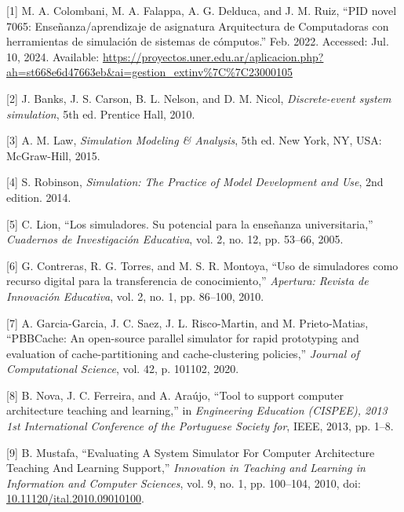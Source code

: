 \documentclass[12pt,twoside]{templates/unerthesis}
\newenvironment{cslreferences}%
  {}%
  {\par}
\begin{document}
\hypertarget{refs}{}
\begin{cslreferences}
\leavevmode\hypertarget{ref-colombani_pid_2022}{}%
{[}1{]} M. A. Colombani, M. A. Falappa, A. G. Delduca, and J. M. Ruiz, ``PID novel 7065: Enseñanza/aprendizaje de asignatura Arquitectura de Computadoras con herramientas de simulación de sistemas de cómputos.'' Feb. 2022. Accessed: Jul. 10, 2024. Available: \url{https://proyectos.uner.edu.ar/aplicacion.php?ah=st668e6d47663eb\&ai=gestion_extinv\%7C\%7C23000105}

\leavevmode\hypertarget{ref-banks_discrete-event_2010}{}%
{[}2{]} J. Banks, J. S. Carson, B. L. Nelson, and D. M. Nicol, \emph{Discrete-event system simulation}, 5th ed. Prentice Hall, 2010.

\leavevmode\hypertarget{ref-law_simulation_2015}{}%
{[}3{]} A. M. Law, \emph{Simulation Modeling \& Analysis}, 5th ed. New York, NY, USA: McGraw-Hill, 2015.

\leavevmode\hypertarget{ref-robinson_simulation_2014}{}%
{[}4{]} S. Robinson, \emph{Simulation: The Practice of Model Development and Use}, 2nd edition. 2014.

\leavevmode\hypertarget{ref-lion_simuladores_2005}{}%
{[}5{]} C. Lion, ``Los simuladores. Su potencial para la enseñanza universitaria,'' \emph{Cuadernos de Investigación Educativa}, vol. 2, no. 12, pp. 53--66, 2005.

\leavevmode\hypertarget{ref-contreras_uso_2010}{}%
{[}6{]} G. Contreras, R. G. Torres, and M. S. R. Montoya, ``Uso de simuladores como recurso digital para la transferencia de conocimiento,'' \emph{Apertura: Revista de Innovación Educativa}, vol. 2, no. 1, pp. 86--100, 2010.

\leavevmode\hypertarget{ref-garcia-garcia_pbbcache_2020}{}%
{[}7{]} A. Garcia-Garcia, J. C. Saez, J. L. Risco-Martin, and M. Prieto-Matias, ``PBBCache: An open-source parallel simulator for rapid prototyping and evaluation of cache-partitioning and cache-clustering policies,'' \emph{Journal of Computational Science}, vol. 42, p. 101102, 2020.

\leavevmode\hypertarget{ref-nova_tool_2013}{}%
{[}8{]} B. Nova, J. C. Ferreira, and A. Araújo, ``Tool to support computer architecture teaching and learning,'' in \emph{Engineering Education (CISPEE), 2013 1st International Conference of the Portuguese Society for}, IEEE, 2013, pp. 1--8.

\leavevmode\hypertarget{ref-mustafa_evaluating_2010}{}%
{[}9{]} B. Mustafa, ``Evaluating A System Simulator For Computer Architecture Teaching And Learning Support,'' \emph{Innovation in Teaching and Learning in Information and Computer Sciences}, vol. 9, no. 1, pp. 100--104, 2010, doi: \href{https://doi.org/10.11120/ital.2010.09010100}{10.11120/ital.2010.09010100}.


\end{cslreferences}
\end{document}

